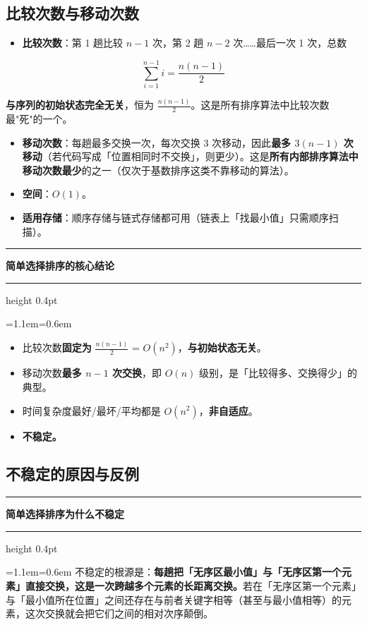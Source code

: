 \documentclass[11pt,openany,UTF8]{ctexbook}
\newcommand{\callouthead}[2]{%
  \par\addvspace{7pt}\noindent
  {\color{#1}\rule[-0.15em]{3pt}{1.05em}}\hspace{0.5em}%
  {\bfseries\color{#1}#2}\par\nobreak\vspace{-0.35em}%
  {\color{rulesep}\hrule height 0.4pt}\nobreak\vspace{0.45em}%
  \begingroup\small\setlength{\parindent}{0pt}%
  \leftskip=1.1em\rightskip=0.6em\noindent\ignorespaces}
\newcommand{\calloutend}{\par\endgroup\addvspace{7pt}}
\newenvironment{callkey}[1]{\callouthead{keybar}{#1}}{\calloutend}
\begin{document}
\subsection{比较次数与移动次数}

\begin{itemize}
\item \textbf{比较次数}：第 1 趟比较 $n-1$ 次，第 2 趟 $n-2$ 次……最后一次 1 次，总数
\end{itemize}
\[\sum_{i=1}^{n-1}i=\frac{n(n-1)}{2}\]

\textbf{与序列的初始状态完全无关}，恒为 $\frac{n(n-1)}{2}$。这是所有排序算法中比较次数最"死"的一个。

\begin{itemize}
\item \textbf{移动次数}：每趟最多交换一次，每次交换 3 次移动，因此\textbf{最多 $3(n-1)$ 次移动}（若代码写成「位置相同时不交换」，则更少）。这是\textbf{所有内部排序算法中移动次数最少}的之一（仅次于基数排序这类不靠移动的算法）。
\item \textbf{空间}：$O(1)$。
\item \textbf{适用存储}：顺序存储与链式存储都可用（链表上「找最小值」只需顺序扫描）。
\end{itemize}
\begin{callkey}{简单选择排序的核心结论}
\begin{itemize}
\item 比较次数\textbf{固定为} $\frac{n(n-1)}{2}$ = $O(n^2)$，\textbf{与初始状态无关}。
\item 移动次数\textbf{最多 $n-1$ 次交换}，即 $O(n)$ 级别，是「比较得多、交换得少」的典型。
\item 时间复杂度最好/最坏/平均都是 $O(n^2)$，\textbf{非自适应}。
\item \textbf{不稳定。}
\end{itemize}
\end{callkey}

\subsection{不稳定的原因与反例}

\begin{callkey}{简单选择排序为什么不稳定}
不稳定的根源是：\textbf{每趟把「无序区最小值」与「无序区第一个元素」直接交换，这是一次跨越多个元素的长距离交换。}若在「无序区第一个元素」与「最小值所在位置」之间还存在与前者关键字相等（甚至与最小值相等）的元素，这次交换就会把它们之间的相对次序颠倒。

\end{callkey}
\end{document}
